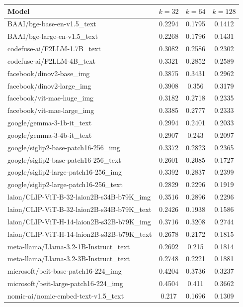 \begin{table}[ht]
\centering
\begin{tabular}{lccc}
\hline
Model & $k=32$ & $k=64$ & $k=128$ \\
\hline
BAAI/bge-base-en-v1.5\_text & 0.2294 & 0.1795 & 0.1412 \\
BAAI/bge-large-en-v1.5\_text & 0.2268 & 0.1796 & 0.1431 \\
codefuse-ai/F2LLM-1.7B\_text & 0.3082 & 0.2586 & 0.2302 \\
codefuse-ai/F2LLM-4B\_text & 0.3321 & 0.2852 & 0.2589 \\
facebook/dinov2-base\_img & 0.3875 & 0.3431 & 0.2962 \\
facebook/dinov2-large\_img & 0.3908 & 0.356 & 0.3179 \\
facebook/vit-mae-huge\_img & 0.3182 & 0.2718 & 0.2335 \\
facebook/vit-mae-large\_img & 0.3385 & 0.2777 & 0.2333 \\
google/gemma-3-1b-it\_text & 0.2994 & 0.2401 & 0.2033 \\
google/gemma-3-4b-it\_text & 0.2907 & 0.243 & 0.2097 \\
google/siglip2-base-patch16-256\_img & 0.3372 & 0.2823 & 0.2365 \\
google/siglip2-base-patch16-256\_text & 0.2601 & 0.2085 & 0.1727 \\
google/siglip2-large-patch16-256\_img & 0.3392 & 0.2837 & 0.2399 \\
google/siglip2-large-patch16-256\_text & 0.2829 & 0.2296 & 0.1919 \\
laion/CLIP-ViT-B-32-laion2B-s34B-b79K\_img & 0.3516 & 0.2896 & 0.2296 \\
laion/CLIP-ViT-B-32-laion2B-s34B-b79K\_text & 0.2426 & 0.1938 & 0.1586 \\
laion/CLIP-ViT-H-14-laion2B-s32B-b79K\_img & 0.3716 & 0.3208 & 0.2744 \\
laion/CLIP-ViT-H-14-laion2B-s32B-b79K\_text & 0.2678 & 0.2172 & 0.1815 \\
meta-llama/Llama-3.2-1B-Instruct\_text & 0.2692 & 0.215 & 0.1814 \\
meta-llama/Llama-3.2-3B-Instruct\_text & 0.2748 & 0.2221 & 0.1881 \\
microsoft/beit-base-patch16-224\_img & 0.4204 & 0.3736 & 0.3237 \\
microsoft/beit-large-patch16-224\_img & 0.4504 & 0.411 & 0.3662 \\
nomic-ai/nomic-embed-text-v1.5\_text & 0.217 & 0.1696 & 0.1309 \\

\end{tabular}
\end{table}
